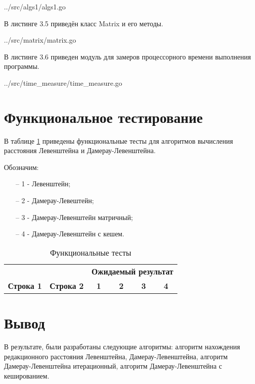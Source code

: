 \begin{lstinputlisting}[
	caption={Рекурсивный с кешем (Дамерау-Левенштейн)},
	label={lst:dlevenshteincache},
	style={go},
	linerange={82-121},
	]{../src/algs1/algs1.go}
\end{lstinputlisting}

В листинге 3.5 приведён класс Matrix и его методы.

\begin{lstinputlisting}[
	caption={Класс Matrix},
	label={lst:matrix},
	style={go},
	]{../src/matrix/matrix.go}
\end{lstinputlisting}

В листинге 3.6 приведен модуль для замеров процессорного времени выполнения программы.

\begin{lstinputlisting}[
	caption={Измерение времени},
	label={lst:time},
	style={go},
	]{../src/time\_measure/time\_measure.go}
\end{lstinputlisting}

\section{Функциональное тестирование}

В таблице \ref{tabular:functional_test} приведены функциональные тесты для алгоритмов вычисления расстояния Левенштейна и Дамерау-Левенштейна.

Обозначим: 
\begin{itemize}
	\item[--] 1 - Левенштейн;
	\item[--] 2 - Дамерау-Левештейн;
	\item[--] 3 - Дамерау-Левенштейн матричный;
	\item[--] 4 - Дамерау-Левенштейн с кешем.
\end{itemize}

\begin{table}[h]
	\begin{center}
		\caption{\label{tabular:functional_test} Функциональные тесты}
		\begin{tabular}{|c|c|c|c|c|c|}
			\hline
			                    &                    & \multicolumn{4}{c|}{\bfseries Ожидаемый результат}    \\ \cline{3-6}
			\bfseries Строка 1  & \bfseries Строка 2 & \bfseries 1 & \bfseries 2 & \bfseries 3 & \bfseries 4
				\csvreader[separator=comma]{inc/csv/functional-test.csv}{}
				{\\\hline \csvlinetotablerow}
				\\\hline
		\end{tabular}
	\end{center}
\end{table}


\section*{Вывод}

В результате, были разработаны следующие алгоритмы: алгоритм нахождения редакционного расстояния Левенштейна, Дамерау-Левенштейна, алгоритм  Дамерау-Левенштейна итерационный, алгоритм Дамерау-Левенштейна с кешированием.
